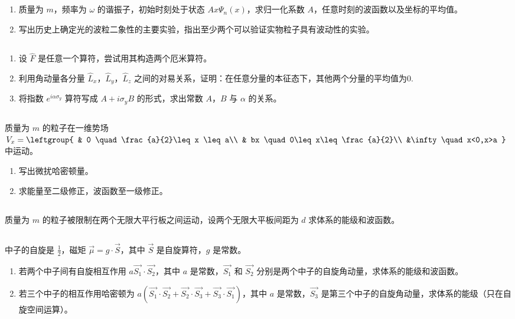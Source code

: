 
\subsection{ }
\begin{enumerate}
\item 质量为 $m$，频率为 $\omega$ 的谐振子，初始时刻处于状态 $Ax\varPsi_{n}(x)$，求归一化系数 $A$，任意时刻的波函数以及坐标的平均值。
\item 写出历史上确定光的波粒二象性的主要实验，指出至少两个可以验证实物粒子具有波动性的实验。
\end{enumerate}
\subsection{ }
\begin{enumerate}
\item 设 $\hat{F}$ 是任意一个算符，尝试用其构造两个厄米算符。
\item 利用角动量各分量 $\hat{L}_{x}$，$\hat{L}_{y}$，$\hat{L}_{z}$ 之间的对易关系，证明：在任意分量的本征态下，其他两个分量的平均值为0.
\item 将指数 $e^{i\alpha \sigma_{y}}$ 算符写成 $A+i\sigma_{y}B$ 的形式，求出常数 $A$，$B$ 与 $\alpha$ 的关系。
\end{enumerate}
\subsection{ }
质量为 $m$ 的粒子在一维势场 $V_{x}=\leftgroup{
    & 0 \quad \frac{a}{2}\leq x \leq a\\
    & bx \quad 0\leq x\leq\frac{a}{2}\\
    &\infty \quad x<0,x>a
    }$ 中运动。
\begin{enumerate}
\item 写出微扰哈密顿量。
\item 求能量至二级修正，波函数至一级修正。
\end{enumerate}
\subsection{ }
质量为 $m$ 的粒子被限制在两个无限大平行板之间运动，设两个无限大平板间距为 $d$ 求体系的能级和波函数。
\subsection{ }
中子的自旋是 $\frac{1}{2}$，磁矩 $\vec{\mu}=g\cdot\vec{S}$，其中 $\vec{S}$ 是自旋算符，$g$ 是常数。
\begin{enumerate}
\item 若两个中子间有自旋相互作用 $a\vec{S_1}\cdot\vec{S_2}$，其中 $a$ 是常数，$\vec{S_1}$ 和 $\vec{S_2}$ 分别是两个中子的自旋角动量，求体系的能级和波函数。
\item 若三个中子的相互作用哈密顿为 $a(\vec{S_{1}}\cdot\vec{S_{2}}+\vec{S_{2}}\cdot\vec{S_{3}}+\vec{S_{3}}\cdot\vec{S_{1}})$，其中 $a$ 是常数，$\vec{S_{3}}$ 是第三个中子的自旋角动量，求体系的能级（只在自旋空间运算）。
\end{enumerate}